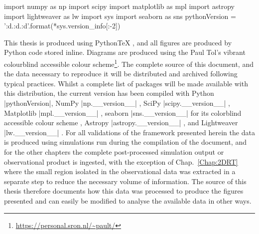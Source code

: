 \begin{pycode}[Intro]
import numpy as np
import scipy
import matplotlib as mpl
import astropy
import lightweaver as lw
import sys
import seaborn as sns
pythonVersion = '{:d}.{:d}.{:d}'.format(*sys.version_info[:-2])
\end{pycode}

This thesis is produced using PythonTeX \citep{Poore2015}, and all figures are produced by Python code stored inline.
Diagrams are produced using the Paul Tol's vibrant colourblind accessible colour scheme\footnote{\url{https://personal.sron.nl/~pault/}}.
The complete source of this document, and the data necessary to reproduce it will be distributed and archived following typical practices.
Whilst a complete list of packages will be made available with this distribution, the current version has been compiled with Python \py[Intro]|pythonVersion|, NumPy \py[Intro]|np.__version__| \citep{Harris2020}, SciPy \py[Intro]|scipy.__version__| \citep{Virtanen2020}, Matplotlib \py[Intro]|mpl.__version__| \citep{Hunter2007}, seaborn \py[Intro]|sns.__version__| for its colorblind accessible colour scheme \citep{Waskom2021}, Astropy \py[Intro]|astropy.__version__| \citep{Robitaille2013,Price-Whelan2018}, and Lightweaver \py[Intro]|lw.__version__| \citep{Osborne2021}.
For all validations of the \Lw{} framework presented herein the data is produced using simulations run during the compilation of the document, and for the other chapters the complete post-processed simulation output or observational product is ingested, with the exception of Chap.~\ref{Chap:2DRT} where the small region isolated in the observational data was extracted in a separate step to reduce the necessary volume of information.
The source of this thesis therefore documents how this data was processed to produce the figures presented and can easily be modified to analyse the available data in other ways.

